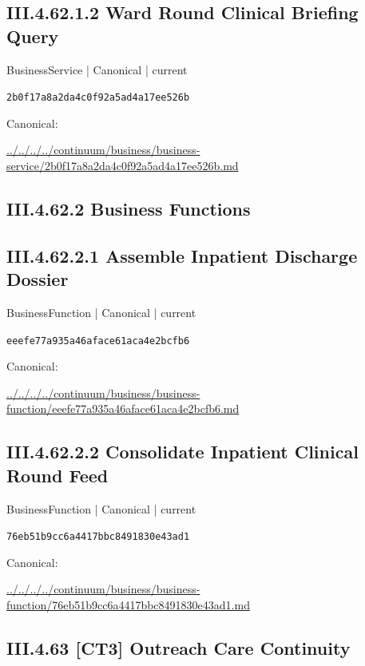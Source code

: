 \documentclass[10pt,a4paper]{article}
\begin{document}
\subsection*{III.4.62.1.2 Ward Round Clinical Briefing Query}
{\small BusinessService | Canonical | current}\par
\texttt{2b0f17a8a2da4c0f92a5ad4a17ee526b}\par
Canonical: \par
{\footnotesize\url{../../../../continuum/business/business-service/2b0f17a8a2da4c0f92a5ad4a17ee526b.md}}\par
\subsection*{III.4.62.2 Business Functions}
\subsection*{III.4.62.2.1 Assemble Inpatient Discharge Dossier}
{\small BusinessFunction | Canonical | current}\par
\texttt{eeefe77a935a46aface61aca4e2bcfb6}\par
Canonical: \par
{\footnotesize\url{../../../../continuum/business/business-function/eeefe77a935a46aface61aca4e2bcfb6.md}}\par
\subsection*{III.4.62.2.2 Consolidate Inpatient Clinical Round Feed}
{\small BusinessFunction | Canonical | current}\par
\texttt{76eb51b9cc6a4417bbc8491830e43ad1}\par
Canonical: \par
{\footnotesize\url{../../../../continuum/business/business-function/76eb51b9cc6a4417bbc8491830e43ad1.md}}\par
\subsection*{III.4.63 [CT3] Outreach Care Continuity}
\end{document}
